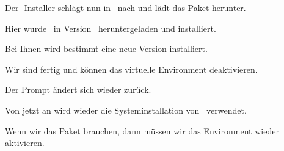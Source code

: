 \documentclass[aspectratio=169,mathserif,notheorems]{beamer}%
\begin{document}
\begin{frame}[t]
\begin{itemize}
{\item<17-> Der \pip-Installer schlägt nun in \pypi\ nach und lädt das Paket herunter.%
\item<18-> Hier wurde \psycopg\ in Version~ heruntergeladen und installiert.%
\item<19-> Bei Ihnen wird bestimmt eine neue Version installiert.%
}%
%
\item<20-> Wir sind fertig und können das virtuelle Environment deaktivieren.%
\item<21-> Der Prompt ändert sich wieder zurück.%
\item<22-> Von jetzt an wird wieder die Systeminstallation von \python\ verwendet.%
\item<23-> Wenn wir das Paket brauchen, dann müssen wir das Environment wieder aktivieren.%
%
\end{itemize}%
%
%
%
%
%
%
%
\end{frame}%
%
\end{document}
